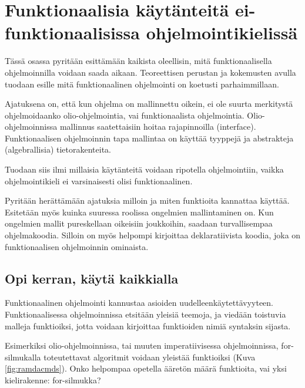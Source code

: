 \vspace{21.5pt}
\chapter{Funktionaalisia käytänteitä ei-funktionaalisissa ohjelmointikielissä }

Tässä osassa pyritään esittämään kaikista oleellisin, mitä funktionaalisella ohjelmoinnilla voidaan saada aikaan. Teoreettisen perustan ja kokemusten avulla tuodaan esille mitä funktionaalinen ohjelmointi on koetusti parhaimmillaan.

Ajatuksena on, että kun ohjelma on mallinnettu oikein, ei ole suurta merkitystä ohjelmoidaanko olio-ohjelmointia, vai funktionaalista ohjelmointia. Olio-ohjelmoinnissa mallinnus saatettaisiin hoitaa rajapinnoilla (interface). Funktionaalisen ohjelmoinnin tapa mallintaa on käyttää tyyppejä ja abstrakteja (algebrallisia) tietorakenteita.


Tuodaan siis ilmi millaisia käytänteitä voidaan ripotella ohjelmointiin, vaikka ohjelmointikieli ei varsinaisesti olisi funktionaalinen.

Pyritään herättämään ajatuksia milloin ja miten funktioita kannattaa käyttää. Esitetään myös kuinka suuressa roolissa ongelmien mallintaminen on. Kun ongelmien mallit pureskellaan oikeisiin joukkoihin, saadaan turvallisempaa ohjelmakoodia. Silloin on myös helpompi kirjoittaa deklaratiivista koodia, joka on funktionaalisen ohjelmoinnin ominaista.



\section{Opi kerran, käytä kaikkialla}

Funktionaalinen ohjelmointi kannustaa asioiden uudelleenkäytettävyyteen. Funktionaalisessa ohjelmoinnissa etsitään yleisiä teemoja, ja viedään toistuvia malleja funktioiksi, jotta voidaan kirjoittaa funktioiden nimiä syntaksin sijasta.


Esimerkiksi olio-ohjelmoinnissa, tai muuten imperatiivisessa ohjelmoinnissa, for-silmukalla toteutettavat algoritmit voidaan yleistää funktioiksi (Kuva \ref{fig:ramdacmds}). Onko helpompaa opetella ääretön määrä funktioita, vai yksi kielirakenne: for-silmukka?

